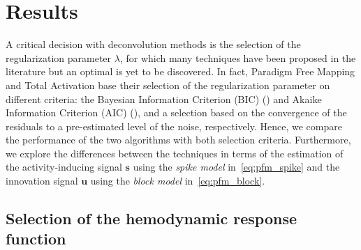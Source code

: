 \section{Results}


A critical decision with deconvolution methods is the selection of the regularization parameter \(\lambda\), for which many techniques have been proposed in the literature but an optimal is yet to be discovered. In fact, Paradigm Free Mapping and Total Activation base their selection of the regularization parameter on different criteria: the Bayesian Information Criterion (BIC) (\citealt{schwarz1978EstimatingDimensionModel}) and Akaike Information Criterion (AIC) (\citealt{akaike1998InformationTheoryExtension}), and a selection based on the convergence of the residuals to a pre-estimated level of the noise, respectively. Hence, we compare the performance of the two algorithms with both selection criteria. Furthermore, we explore the differences between the techniques in terms of the estimation of the activity-inducing signal \(\mathbf{s}\) using the \textit{spike model} in~\eqref{eq:pfm_spike} and the innovation signal \(\mathbf{u}\) using the \textit{block model} in~\eqref{eq:pfm_block}.

\subsection{Selection of the hemodynamic response function}

